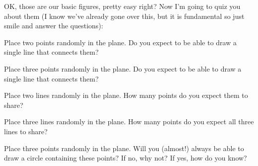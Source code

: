 OK, those are our basic figures, pretty easy right? Now I'm going to
quiz you about them (I know we've already gone over this, but it is
fundamental so just smile and answer the questions):

\begin{ques} 
Place two points randomly in the plane. Do you expect to be able to
draw a single line that connects them?
\end{ques}
\QM

\begin{ques} 
Place three points randomly in the plane. Do you expect to be able to
draw a single line that connects them?
\end{ques}
\QM

\begin{ques} 
Place two lines randomly in the plane. How many points do you expect
them to share?
\end{ques}
\QM


\begin{ques} 
Place three lines randomly in the plane. How many points do you expect
all three lines to share?
\end{ques}
\QM


\begin{ques} 
Place three points randomly in the plane. Will you (almost!) always be
able to draw a circle containing these points? If no, why not? If yes,
how do you know?
\end{ques}
\QM


%
%
%
%
%


